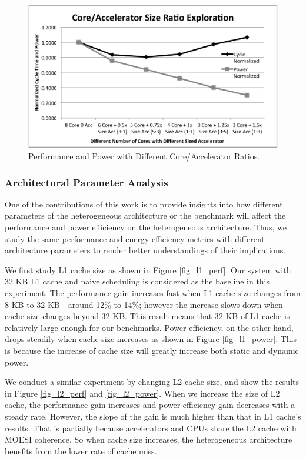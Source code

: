 \begin{figure}
    \centering
    \includegraphics[width=4.5in]{Core-Acc-Size-Ratio}
    \caption{Performance and Power with Different Core/Accelerator Ratios.}
    \label{fig_core_acc_ratio}
\end{figure}

\subsubsection{Architectural Parameter Analysis}
One of the contributions of this work is to provide insights into how
different parameters of the heterogeneous architecture or the
benchmark will affect the performance and power efficiency on the
heterogeneous architecture. Thus, we study the same performance and
energy efficiency metrics with different architecture parameters to
render better understandings of their implications. 

We first study L1 cache size as shown in Figure \ref{fig_l1_perf}. Our
system with 32 KB L1 cache and naive scheduling is considered as the
baseline in this experiment. The performance gain increases fast when
L1 cache size changes from 8 KB to 32 KB - around 12\% to 14\%;
however the increase slows down when cache size changes beyond 32
KB. This result means that 32 KB of L1 cache is relatively large
enough for our benchmarks. Power efficiency, on the other hand, drops
steadily when cache size increases as shown in Figure
\ref{fig_l1_power}. This is because the increase of cache size will
greatly increase both static and dynamic power. 

We conduct a similar experiment by changing L2 cache size, and show
the results in Figure \ref{fig_l2_perf} and \ref{fig_l2_power}. When
we increase the size of L2 cache, the performance gain increases and
power efficiency gain decreases with a steady rate. However, the slope of the gain is much higher than that in L1 cache's results. That is partially because accelerators and CPUs share the L2 cache with MOESI coherence. So when cache size increases, the heterogeneous architecture benefits from the lower rate of cache miss. 

